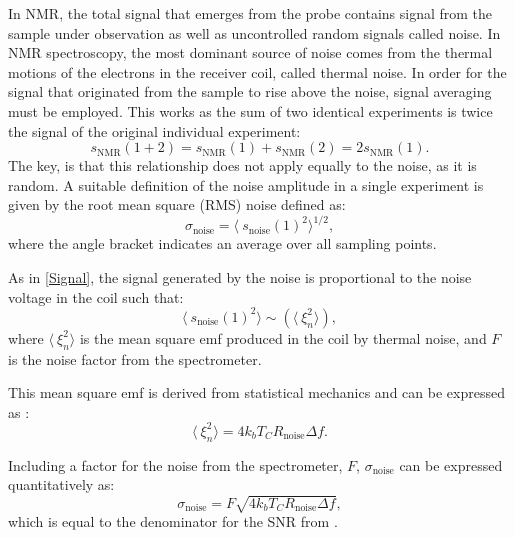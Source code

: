 In NMR, the total signal that emerges from the probe contains signal from the sample
under observation as well as uncontrolled random signals called noise. In NMR spectroscopy, the most dominant source of noise comes
from the thermal motions of the electrons
in the receiver coil, called thermal noise. In order for the signal that originated from the sample to rise above the noise,
signal averaging must be employed. This works as the sum of two identical experiments is twice the signal
of the original individual experiment:
\begin{equation}
  s_\text{NMR}(1+2) = s_\text{NMR}(1) + s_\text{NMR}(2) = 2s_\text{NMR}(1).
\end{equation}
The key, is that this relationship does not apply equally to the noise, as it is random. A suitable
definition of the noise amplitude in a single experiment is given by the root mean square (RMS) noise defined
as:
\begin{equation}
  \sigma_\text{noise} = \langle~s_{\text{noise}}(1)^2\rangle^{1/2},
\end{equation}
where the angle bracket indicates an average over all sampling points.

As in \ref{Signal}, the signal generated by the noise is proportional to the noise
voltage in the coil such that:
\begin{equation}
  \langle~s_{\text{noise}}(1)^2\rangle \sim (\langle~\xi_n^2\rangle),
\end{equation}
where $\langle~\xi_n^2\rangle$ is the mean square emf produced in the coil by thermal noise, and $F$ is the noise
factor from the spectrometer.

This mean square emf is derived from statistical mechanics and can be expressed as \citep{nyquist1928thermal, johnson1928thermal}:
\begin{equation}
  \langle~\xi_n^2\rangle = 4k_bT_CR_{\text{noise}}\Delta{f}.
\end{equation}

Including a factor for the noise from the spectrometer, $F$, $\sigma_\text{noise}$ can be expressed
quantitatively as:
\begin{equation}
  \sigma_\text{noise} = F\sqrt{4k_bT_CR_{\text{noise}}\Delta{f}},
\end{equation}
which is equal to the denominator for the SNR from .

